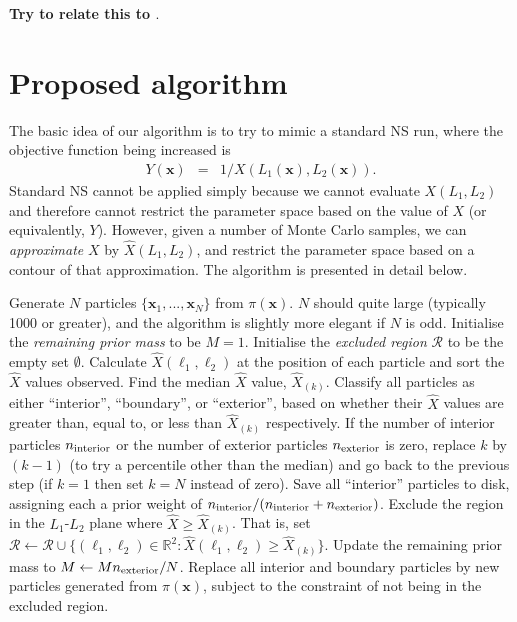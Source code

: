 \documentclass[journal,article,accept,moreauthors,pdftex,12pt,a4paper]{mdpi}
\newcommand{\xx}{\boldsymbol{x}}
\begin{document}
{\bf Try to relate this to \citet{vertical}}.

\section{Proposed algorithm}\label{sec:algorithm}

The basic idea of our algorithm is to try to mimic a standard NS run, where the
objective function being increased is
\begin{eqnarray}
Y(\xx) &=& 1/X\left(L_1(\xx), L_2(\xx)\right).
\end{eqnarray}
Standard NS cannot be applied simply because we cannot evaluate $X(L_1, L_2)$ and
therefore cannot restrict the parameter space based on the value of $X$ (or
equivalently, $Y$). However, given a number of Monte Carlo samples, we
can {\em approximate} $X$ by $\hat{X}(L_1, L_2)$, and restrict the parameter
space based on a contour of that approximation.
The algorithm is presented in detail below.

\begin{algorithm}[ht!]
\begin{algorithmic}
\State Generate $N$ particles $\{\xx_1, ..., \xx_N\}$ from $\pi(\xx)$.
$N$ should quite large (typically 1000 or greater), and the algorithm is
slightly more elegant if $N$ is odd.
\State Initialise the {\em remaining prior mass} to be $M=1$.
\State Initialise the {\em excluded region} $\mathcal{R}$ to be the empty set
$\emptyset$.
	\State Calculate $\hat{X}(\ell_1, \ell_2)$ at the position of each particle
			and sort the $\hat{X}$ values observed.
	\State Find the median $\hat{X}$ value, $\hat{X}_{(k)}$.
	\State Classify all particles as either ``interior'', ``boundary'', or
			``exterior'', based on whether their $\hat{X}$ values are
			greater than, equal to, or less than $\hat{X}_{(k)}$ respectively.
	\State If the number of interior particles $n_{\rm interior}$ or the number
			of exterior particles $n_{\rm exterior}$ is zero, replace $k$ by
			$(k-1)$ (to try a percentile other than the median)
			and go back to the previous step (if $k=1$ then set $k=N$ instead of zero).
	\State Save all ``interior'' particles to disk, assigning each a prior weight of $n_{\rm interior}/(n_{\rm interior} + n_{\rm exterior})$.
	\State Exclude the region in the $L_1$-$L_2$ plane where
$\hat{X} \geq \hat{X}_{(k)}$. That is, set
	\State \hspace{20pt} $\mathcal{R} \leftarrow \mathcal{R} \cup \{(\ell_1, \ell_2) \in \mathbb{R}^2: \hat{X}(\ell_1, \ell_2) \geq \hat{X}_{(k)}\}$.
	\State Update the remaining prior mass to $M \leftarrow M n_{\rm exterior}/N$.
	\State Replace all interior and boundary particles by new
			particles generated from $\pi(\xx)$, subject to the constraint
			of not being in the excluded region.
\EndWhile
\end{algorithmic}
\caption{\label{alg:algorithm}}
\end{algorithm}
\end{document}
